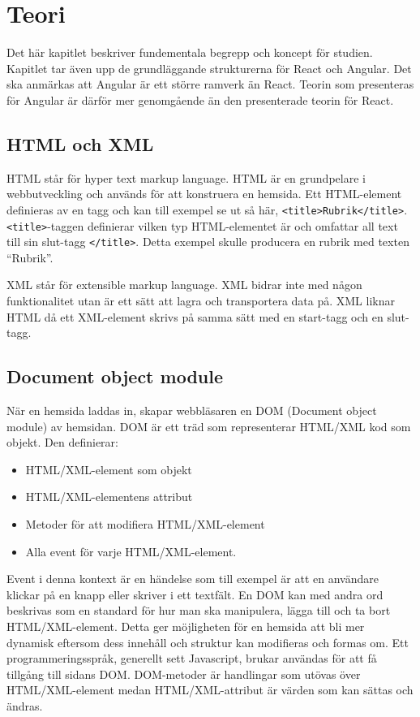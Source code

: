 \section{Teori}
\label{sec:axel-theory}
Det här kapitlet beskriver fundementala begrepp och koncept för studien. Kapitlet tar även upp de grundläggande strukturerna för React och Angular. Det ska anmärkas att Angular är ett större ramverk än React. Teorin som presenteras för Angular är därför mer genomgående än den presenterade teorin för React.

\subsection{HTML och XML}
HTML står för hyper text markup language. HTML är en grundpelare i webbutveckling och används för att konstruera en hemsida.\cite{w3-html} Ett HTML-element definieras av en tagg och kan till exempel se ut så här, \texttt{<title>Rubrik</title>}. \texttt{<title>}-taggen definierar vilken typ HTML-elementet är och omfattar all text till sin slut-tagg \texttt{</title>}. Detta exempel skulle producera en rubrik med texten ``Rubrik''. 

XML står för extensible markup language. XML bidrar inte med någon funktionalitet utan är ett sätt att lagra och transportera data på. XML liknar HTML då ett XML-element skrivs på samma sätt med en start-tagg och en slut-tagg.

\subsection{Document object module}
När en hemsida laddas in, skapar webbläsaren en DOM (Document object module) av hemsidan. DOM är ett träd som representerar HTML/XML kod som objekt. \cite{w3-htmldom} Den definierar:

\begin{itemize}
\item HTML/XML-element som objekt
\item HTML/XML-elementens attribut
\item Metoder för att modifiera HTML/XML-element
\item Alla event för varje HTML/XML-element.
\end{itemize} 

Event i denna kontext är en händelse som till exempel är att en användare klickar på en knapp eller skriver i ett textfält. En DOM kan med andra ord beskrivas som en standard för hur man ska manipulera, lägga till och ta bort HTML/XML-element. Detta ger möjligheten för en hemsida att bli mer dynamisk eftersom dess innehåll och struktur kan modifieras och formas om. Ett programmeringsspråk, generellt sett Javascript, brukar användas för att få tillgång till sidans DOM. DOM-metoder är handlingar som utövas över HTML/XML-element medan HTML/XML-attribut är värden som kan sättas och ändras.

